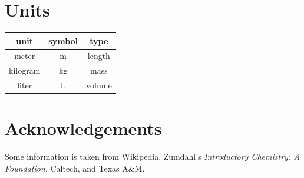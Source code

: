 \documentclass[]{article}
\begin{document}
\section{Units}

\vspace{.5cm}
\begin{tabular}{ | c | c | c | }
    \hline
    unit & symbol & type \\ \hline
    meter & m & length \\ \hline
    kilogram & kg & mass \\ \hline
    liter & L & volume \\ \hline
\end{tabular}

\section{Acknowledgements}

Some information is taken from Wikipedia, Zumdahl's \emph{Introductory Chemistry: A Foundation}, Caltech, and Texas A\&M.
\end{document}
